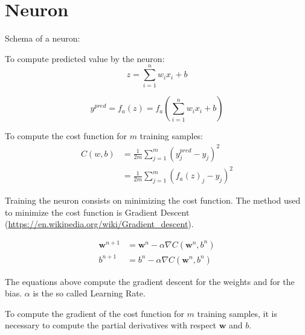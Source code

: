 \documentclass{article}
\begin{document}
\section*{Neuron}

Schema of a neuron:
\begin{center}
\end{center}

To compute predicted value by the neuron:
\begin{equation}
  z = \sum_{i=1}^n w_ix_i + b
\end{equation}

\begin{equation}
  y^{pred} = f_a(z) = f_a(\sum_{i=1}^n w_ix_i + b)
\end{equation}

To compute the cost function for $m$ training samples:
\begin{align}
  C(w,b) &= \frac{1}{2m} \sum_{j=1}^m \left(y_j^{pred} - y_j\right)^2 \nonumber \\
         &= \frac{1}{2m} \sum_{j=1}^m \left(f_a(z)_j - y_j\right)^2
\end{align}

Training the neuron consists on minimizing the cost function. The method used to minimize the cost function is Gradient Descent (\url{https://en.wikipedia.org/wiki/Gradient_descent}).

\begin{align}
  \mathbf{w}^{n+1} &= \mathbf{w}^n - \alpha \nabla C(\mathbf{w}^n, b^n) \\
  b^{n+1} &= b^n - \alpha \nabla C(\mathbf{w}^n, b^n)
\end{align}

The equations above compute the gradient descent for the weights and for the bias. $\alpha$ is the so called Learning Rate.

To compute the gradient of the cost function for $m$ training samples, it is necessary to compute the partial derivatives with respect $\mathbf{w}$ and $b$.
\end{document}
